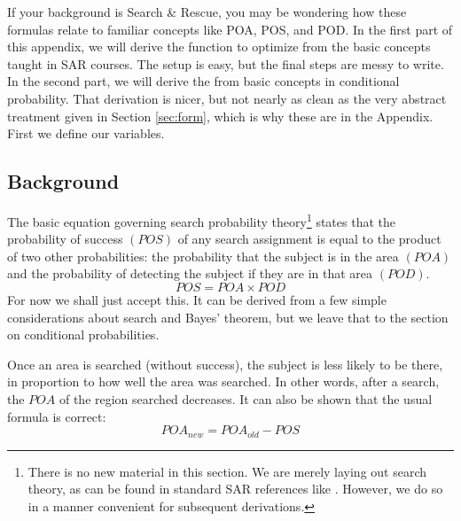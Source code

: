 
\label{sec:terms}

If your background is Search \& Rescue, you may be wondering how these
formulas relate to familiar concepts like POA, POS, and POD.  In the
first part of this appendix, we will derive the function to optimize
from the basic concepts taught in SAR courses. The setup is easy, but
the final steps are messy to write.  In the second part, we will
derive the from basic concepts in conditional probability. That
derivation is nicer, but not nearly as clean as the very abstract
treatment given in Section \ref{sec:form}, which is why these are in
the Appendix. First we define our variables.

\subsection{Background}
\label{sec:Background}

The basic equation governing search probability theory\footnote{There
  is no new material in this section. We are merely laying out search
  theory, as can be found in standard SAR references like
  \cite{frost99:_principles, syrotuck75:_introduction,
    cooper00_adjpoa, cooper00_defs}. However, we
do so in a manner convenient for subsequent derivations.} states that the
probability of success $(POS)$ of any search assignment is equal to
the product of two other probabilities: the probability that the
subject is in the area $(POA)$ and the probability of detecting the
subject if they are in that area $(POD)$.
\begin{equation}
  \label{eq:POS}
  POS = POA \times POD
\end{equation}
For now we shall just accept this. It can be derived from a few simple
considerations about search and Bayes' theorem, but we leave that to
the section on conditional probabilities.

Once an area is searched (without
success), the subject is less likely to be there, in proportion to how 
well the area was searched. In other words, after a search, the $POA$ of 
the region searched decreases. It can also be shown that the usual
formula is correct:
\begin{equation}
  \label{eq:POA_new}
  POA_{new} = POA_{old} - POS
\end{equation}

